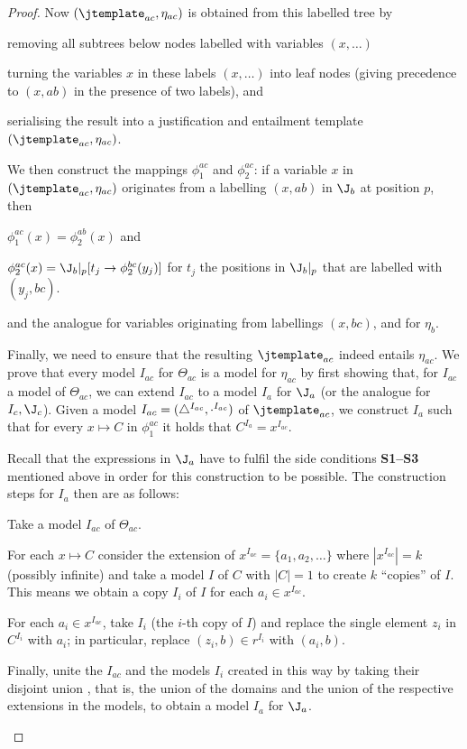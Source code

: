 \begin{proof}
Now $(\jtemplate_{ac}, \eta_{ac})$ is obtained from this labelled tree by 
\begin{compactitem}
\item removing all subtrees below nodes labelled with variables $(x,\ldots)$ 
\item turning the variables $x$ in these labels $(x,\ldots)$ into leaf nodes (giving precedence to $(x,ab)$ in the presence of two labels), and 
\item serialising the result into a justification and entailment template $(\jtemplate_{ac}, \eta_{ac})$.
\end{compactitem}

We then construct the mappings $\phi^{ac}_{1}$ and $\phi^{ac}_{2}$: if a variable $x$ in $(\jtemplate_{ac}, \eta_{ac})$ originates from a labelling $(x,ab)$ in $\J_{b}$ at position $p$, then 
\begin{compactitem}
\item $\phi^{ac}_{1}(x) = \phi^{ab}_{2}(x)$ and
\item $\phi^{ac}_{2}(x) = \J_{b}|_{p} [t_{j} \rightarrow \phi^{bc}_{2}(y_{j})]$ for $t_{j}$ the positions in $\J_{b}|_{p}$ that are labelled with $(y_{j}, bc)$.
\end{compactitem}
and the analogue for variables originating from labellings $(x, bc)$, and for $\eta_{b}$.

Finally, we need to ensure that the resulting $\jtemplate_{ac}$ indeed entails $\eta_{ac}$. We prove that every model $I_{ac}$ for $\Theta_{ac}$ is a model for $\eta_{ac}$ by first showing that, for $I_{ac}$ a model of $\Theta_{ac}$, we can extend $I_{ac}$ to a model $I_{a}$ for $\J_{a}$ (or the analogue for $I_{c}, \J_{c}$). Given a model $I_{ac} = (\bigtriangleup^{I_{ac}}, \cdot^{I_{ac}})$ of $\jtemplate_{ac}$, we construct $I_{a}$ such that for every $x \mapsto C$ in $\phi^{ac}_{1}$ it holds that $C^{I_{a}} = x^{I_{ac}}$. 

Recall that the expressions in $\J_{a}$ have to fulfil the side conditions \textbf{S1--S3} mentioned above in order for this construction to be possible. The construction steps for $I_{a}$ then are as follows:
\begin{compactitem}
\item Take a model $I_{ac}$ of $\Theta_{ac}$.
\item For each $x \mapsto C$ consider the extension of $x^{I_{ac}} = \{a_{1}, a_{2}, \ldots\}$ where $\left| x^{I_{ac}}\right| = k$ (possibly infinite) and take a model $I$ of $C$ with $\left|C \right| = 1$ to create $k$ \enquote{copies} of $I$. This means we obtain a copy $I_{i}$ of $I$ for each $a_{i} \in x^{I_{ac}}.$
\item For each $a_{i} \in x^{I_{ac}}$, take $I_{i}$ (the $i$-th copy of $I$) and replace the single element $z_{i}$ in $C^{I_{i}}$ with $a_{i}$; in particular, replace $(z_{i}, b) \in r^{I_{i}}$ with $(a_{i}, b)$.
\item Finally, unite the $I_{ac}$ and the models $I_{i}$ created in this way by taking their disjoint union \cite[p 191]{lutz02gy}, that is, the union of the domains and the union of the respective extensions in the models, to obtain a model $I_{a}$ for $\J_{a}$.
\end{compactitem}


\end{proof}
